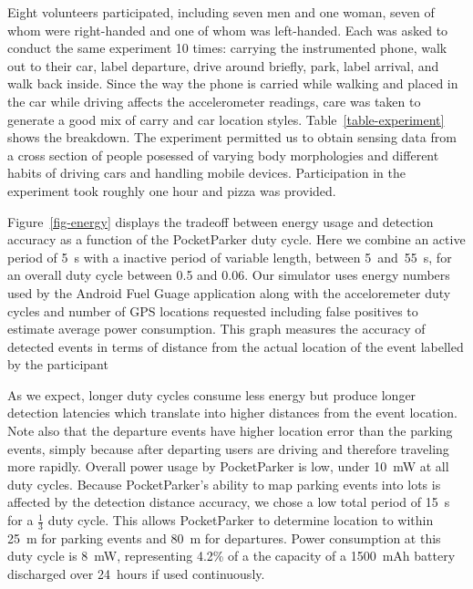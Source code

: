 Eight volunteers participated, including seven men and one woman, seven of
whom were right-handed and one of whom was left-handed. Each was asked to
conduct the same experiment 10 times: carrying the instrumented phone, walk
out to their car, label departure, drive around briefly, park, label arrival,
and walk back inside. Since the way the phone is carried while walking and
placed in the car while driving affects the accelerometer readings, care was
taken to generate a good mix of carry and car location styles.
Table~\ref{table-experiment} shows the breakdown. The experiment permitted us
to obtain sensing data from a cross section of people posessed of varying
body morphologies and different habits of driving cars and handling mobile
devices. Participation in the experiment took roughly one hour and pizza was
provided.

Figure~\ref{fig-energy} displays the tradeoff between energy usage and
detection accuracy as a function of the PocketParker duty cycle. Here we
combine an active period of 5~s with a inactive period of variable length,
between 5~and~55~s, for an overall duty cycle between 0.5 and 0.06. Our
simulator uses energy numbers used by the Android Fuel Guage application
along with the acceloremeter duty cycles and number of GPS locations
requested including false positives to estimate average power consumption.
This graph measures the accuracy of detected events in terms of distance from
the actual location of the event labelled by the participant

As we expect, longer duty cycles consume less energy but produce longer
detection latencies which translate into higher distances from the event
location. Note also that the departure events have higher location error than
the parking events, simply because after departing users are driving and
therefore traveling more rapidly. Overall power usage by PocketParker is low,
under 10~mW at all duty cycles. Because PocketParker's ability to map parking
events into lots is affected by the detection distance accuracy, we chose a
low total period of 15~s for a $\frac{1}{3}$ duty cycle. This allows
PocketParker to determine location to within 25~m for parking events and 80~m
for departures. Power consumption at this duty cycle is 8~mW, representing
4.2\% of a the capacity of a 1500~mAh battery discharged over 24~hours if
used continuously.

